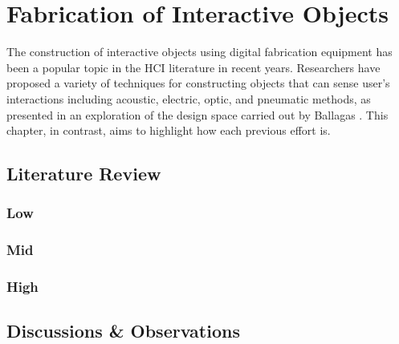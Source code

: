 \chapter{Fabrication of Interactive Objects}
  The construction of interactive objects using digital fabrication equipment
  has been a popular topic in the HCI literature in recent years. Researchers
  have proposed a variety of techniques for constructing objects that can sense
  user's interactions including acoustic, electric, optic, and pneumatic
  methods, as presented in an exploration of the design space carried out by
  Ballagas \etal. This chapter, in contrast, aims to highlight how \pap each
  previous effort is.

  \section{Literature Review}
    \subsection*{Low \pap}
    \subsection*{Mid \pap}
    \subsection*{High \pap}
  
  \section{Discussions \& Observations}